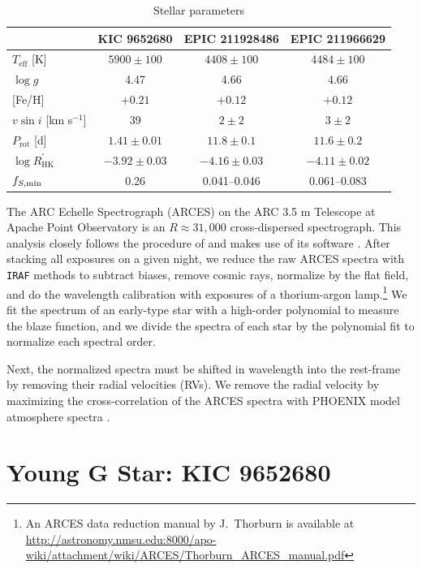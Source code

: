 \begin{table}
\centering
\begin{tabular}{l|ccc}
 & KIC 9652680 & EPIC 211928486 & EPIC 211966629\\ \hline
$T_\mathrm{eff}$ [K] & $5900 \pm 100$ & $4408\pm 100$ & $4484\pm 100$ \\
$\log g$ & 4.47 & 4.66 & 4.66 \\
$[$Fe/H$]$ & $+0.21$ & $+0.12$ & $+0.12$ \\
$v \sin  i$ [km s$^{-1}$] & 39 & $2\pm2$ & $3\pm2$ \\
$P_\mathrm{rot}$ [d] & $1.41 \pm 0.01$ & $11.8 \pm 0.1$ & $11.6 \pm 0.2$ \\
$\log R^\prime_\mathrm{HK}$ & $-3.92 \pm 0.03$ & $-4.16 \pm 0.03$ & $-4.11 \pm 0.02$  \\
$f_{S, \rm min}$ & 0.26 & 0.041--0.046 &  0.061--0.083
\end{tabular}
\caption{Stellar parameters\label{tab:stellarprops}}
\end{table}

The ARC Echelle Spectrograph (ARCES) on the ARC 3.5 m Telescope at Apache Point Observatory is an $R\approx31,000$ cross-dispersed spectrograph.  This analysis closely follows the procedure of \citet{Morris2017b} and makes use of its software \citep{aesop}. After stacking all exposures on a given night, we reduce the raw ARCES spectra with \texttt{IRAF} methods to subtract biases, remove cosmic rays, normalize by the flat field, and do the wavelength calibration with exposures of a thorium-argon lamp.\footnote{An ARCES data reduction manual by J.~Thorburn is available at \url{http://astronomy.nmsu.edu:8000/apo-wiki/attachment/wiki/ARCES/Thorburn_ARCES_manual.pdf}} We fit the spectrum of an early-type star with a high-order polynomial to measure the blaze function, and we divide the spectra of each star by the polynomial fit to normalize each spectral order.

Next, the normalized spectra must be shifted in wavelength into the rest-frame by removing their radial velocities (RVs). We remove the radial velocity by maximizing the cross-correlation of the ARCES spectra with PHOENIX model atmosphere spectra \citep{Husser2013}.

\section{Young G Star: KIC 9652680} \label{sec:gstar}
